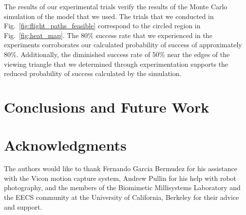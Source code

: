 \documentclass{aamas2013}
\begin{document}
The results of our experimental trials verify the results of the Monte Carlo
simulation of the model that we used. The trials that we conducted in
Fig.~\ref{fig:flight_paths_feasible} correspond to the circled region in
Fig.~\ref{fig:heat_map}. The 80\% success rate that we experienced in the
experiments corroborates our calculated probability of success of
approximately 80\%. Additionally, the diminished success rate of 50\% near the
edges of the viewing triangle that we determined through experimentation
supports the reduced probability of success calculated by the simulation.



\section{Conclusions and Future Work}
\section{Acknowledgments}
The authors would like to thank Fernando Garcia Bermudez for his 
assistance with the Vicon motion capture system, Andrew Pullin for his 
help with robot photography, and the members of the Biomimetic 
Millisystems Laboratory and the EECS community at the University of 
California, Berkeley for their advice and support.






\end{document}
